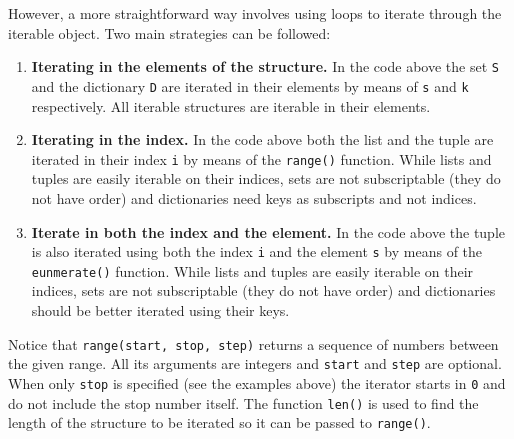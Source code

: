 However, a more straightforward way involves using loops to iterate through the iterable object.
Two main strategies can be followed: 
\begin{enumerate}
    \item \textbf{Iterating in the elements of the structure.} 
    In the code above the set \texttt{S} and the dictionary \texttt{D} are iterated in their elements
    by means of \texttt{s} and \texttt{k} respectively. 
    All iterable structures are iterable in their elements.  
    \item \textbf{Iterating in the index.}
    In the code above both the list and the tuple are iterated in their index \texttt{i} by means of the \texttt{range()} function.
    While lists and tuples are easily iterable on their indices, 
    sets are not subscriptable (they do not have order) and 
    dictionaries need keys as subscripts and not indices. 
    \item \textbf{Iterate in both the index and the element.} 
    In the code above the tuple is also iterated using both the index \texttt{i} and the element \texttt{s} 
    by means of the \texttt{eunmerate()} function.
    While lists and tuples are easily iterable on their indices, 
    sets are not subscriptable (they do not have order) and 
    dictionaries should be better iterated using their keys.
\end{enumerate} 

Notice that \texttt{range(start, stop, step)} returns a sequence of numbers between the given range.
All its arguments are integers and \texttt{start} and \texttt{step} are optional.
When only \texttt{stop} is specified (see the examples above) the iterator starts in \texttt{0} and do not include the stop number itself.
The function \texttt{len()} is used to find the length of the structure to be iterated so it can be passed to \texttt{range()}. 

 











